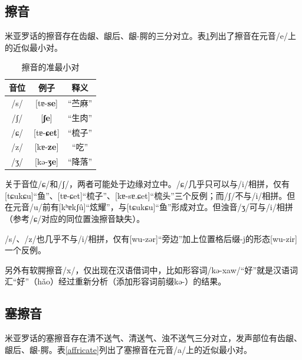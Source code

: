 \subsection{擦音}

米亚罗话的擦音存在齿龈、龈后、龈-腭的三分对立。表\ref{fricative}列出了擦音在元音/e/上的近似最小对。

\begin{table}[H]
\vspace{5pt}
    \centering
    \caption{擦音的准最小对}
    \label{fricative}
\begin{tabular}{ccc}
   \toprule
    音位 & 例子 & 释义 \\
   \midrule
   /s/ & [tɐ-\textbf{se}] & “苎麻”  \\
   /ʃ/ & [\textbf{ʃe}] & “生肉”  \\
   /ɕ/ & [tɐ-\textbf{ɕet}] & “梳子”  \\
   /z/ & [kɐ-\textbf{ze}] & “吃”  \\
   /ʒ/ & [kə-\textbf{ʒe}] & “降落” \\
   \bottomrule
\end{tabular}
\end{table}

关于音位/ɕ/和/ʃ/，两者可能处于边缘对立中。/ɕ/几乎只可以与/i/相拼，仅有[tɕukɕu]“鱼”、[tɐ-ɕet]“梳子”、[kɐ-sɐ.ɕet]“梳头”三个反例；而/ʃ/不与/i/相拼。但在元音/u/前有[kʰɐkʃû]“炫耀”，与[tɕukɕu]“鱼”形成对立。但浊音/ʒ/可与/i/相拼（参考/ɕ/对应的同位置浊擦音缺失）。

/s/、/z/也几乎不与/i/相拼，仅有[wu-zər]“旁边”加上位置格后缀-j的形态[wu-zir]一个反例。

另外有软腭擦音/x/，仅出现在汉语借词中，比如形容词/kə-xaw/“好”就是汉语词汇“好”（hǎo）经过重新分析（添加形容词前缀kə-）的结果。


\subsection{塞擦音}

米亚罗话的塞擦音存在清不送气、清送气、浊不送气三分对立，发声部位有齿龈、龈后、龈-腭。表\ref{affricate}列出了塞擦音在元音/a/上的近似最小对。

